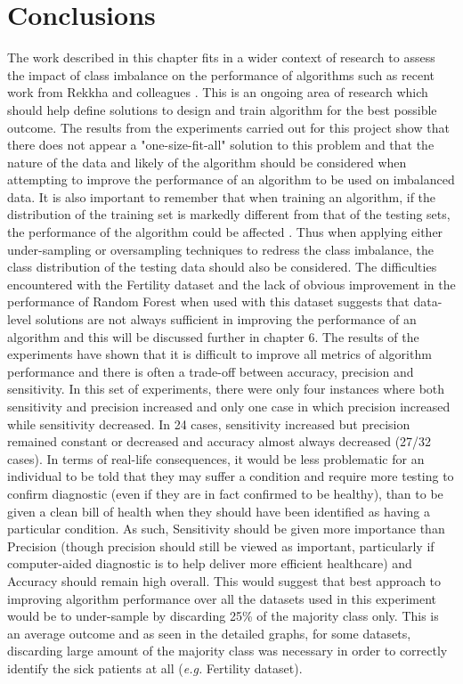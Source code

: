 \section{Conclusions}
The work described in this chapter fits in a wider context of research to assess the impact of class imbalance on the performance of algorithms such as recent work from Rekkha and colleagues \citep{Rekha:2019uu}. This is an ongoing area of research which should help define solutions to design and train algorithm for the best possible outcome.\newline
The results from the experiments carried out for this project show that there does not appear a "one-size-fit-all" solution to this problem and that the nature of the data and likely of the algorithm should be considered when attempting to improve the performance of an algorithm to be used on imbalanced data.\newline
It is also important to remember that when training an algorithm, if the distribution of the training set is markedly different from that of the testing sets, the performance of the algorithm could be affected \citep{Ling:2017jm}. Thus when applying either under-sampling or oversampling techniques to redress the class imbalance, the class distribution of the testing data should also be considered.\newline
The difficulties encountered with the Fertility dataset and the lack of obvious improvement in the performance of Random Forest when used with this dataset suggests that data-level solutions are not always sufficient in improving the performance of an algorithm and this will be discussed further in chapter 6.
The results of the experiments have shown that it is difficult to improve all metrics of algorithm performance and there is often a trade-off between accuracy, precision and sensitivity. In this set of experiments, there were only four  instances where both sensitivity and precision increased and only one case in which precision increased while sensitivity decreased. In 24 cases, sensitivity increased but precision remained constant or decreased and accuracy almost always decreased (27/32 cases).
In terms of real-life consequences, it would be less problematic for an individual to be told that they may suffer a condition and require more testing to confirm diagnostic (even if they are in fact confirmed to be healthy), than to be given a clean bill of health when they should have been identified as having a particular condition. As such, Sensitivity should be given more importance than Precision (though precision should still be viewed as important, particularly if computer-aided diagnostic is to help deliver more efficient healthcare) and Accuracy should remain high overall. This would suggest that best approach to improving algorithm performance over all the datasets used in this experiment would be to under-sample by discarding 25\% of the majority class only. This is an average outcome and as seen in the detailed graphs, for some datasets, discarding large amount of the majority class was necessary in order to correctly identify the sick patients at all (\textit{e.g.} Fertility dataset). \newline
